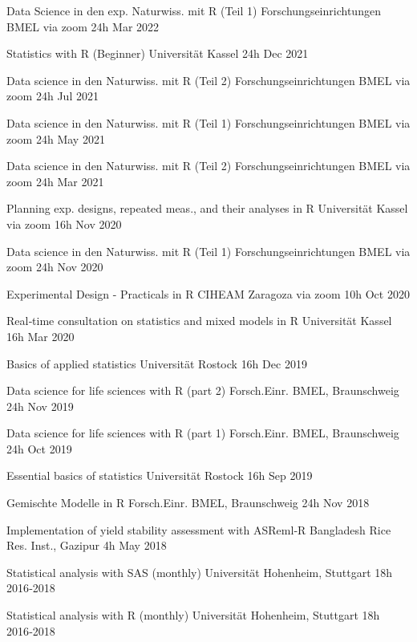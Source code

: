 \documentclass[11pt,a4paper,]{awesome-cv}
\begin{document}
\begin{cvhonors}
\cvhonor
{Data Science in den exp. Naturwiss. mit R (Teil 1)  }
{Forschungseinrichtungen BMEL via zoom}
{24h}
{Mar 2022  }

\cvhonor
{Statistics with R (Beginner)  }
{Universität Kassel}
{24h}
{Dec 2021  }

\cvhonor
{Data science in den Naturwiss. mit R (Teil 2)  }
{Forschungseinrichtungen BMEL via zoom}
{24h}
{Jul 2021  }

\cvhonor
{Data science in den Naturwiss. mit R (Teil 1)  }
{Forschungseinrichtungen BMEL via zoom}
{24h}
{May 2021  }

\cvhonor
{Data science in den Naturwiss. mit R (Teil 2)  }
{Forschungseinrichtungen BMEL via zoom}
{24h}
{Mar 2021  }

\cvhonor
{Planning exp. designs, repeated meas., and their analyses in R  }
{Universität Kassel via zoom}
{16h}
{Nov 2020  }

\cvhonor
{Data science in den Naturwiss. mit R (Teil 1)  }
{Forschungseinrichtungen BMEL via zoom}
{24h}
{Nov 2020  }

\cvhonor
{Experimental Design - Practicals in R  }
{CIHEAM Zaragoza via zoom}
{10h}
{Oct 2020  }

\cvhonor
{Real‑time consultation on statistics and mixed models in R  }
{Universität Kassel}
{16h}
{Mar 2020  }

\cvhonor
{Basics of applied statistics  }
{Universität Rostock}
{16h}
{Dec 2019  }

\cvhonor
{Data science for life sciences with R (part 2)  }
{Forsch.Einr. BMEL, Braunschweig}
{24h}
{Nov 2019  }

\cvhonor
{Data science for life sciences with R (part 1)  }
{Forsch.Einr. BMEL, Braunschweig}
{24h}
{Oct 2019  }

\cvhonor
{Essential basics of statistics  }
{Universität Rostock}
{16h}
{Sep 2019  }

\cvhonor
{Gemischte Modelle in R  }
{Forsch.Einr. BMEL, Braunschweig}
{24h}
{Nov 2018  }

\cvhonor
{Implementation of yield stability assessment with ASReml‑R  }
{Bangladesh Rice Res. Inst., Gazipur}
{4h}
{May 2018  }

\cvhonor
{Statistical analysis with SAS (monthly)  }
{Universität Hohenheim, Stuttgart}
{18h}
{2016‑2018  }

\cvhonor
{Statistical analysis with R (monthly)  }
{Universität Hohenheim, Stuttgart}
{18h}
{2016‑2018  }\end{cvhonors}
\end{document}
